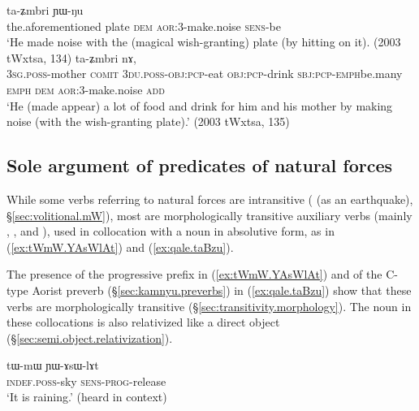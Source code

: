 \begin{exe}
\ex 
\begin{xlist}
\ex \label{ex:taZmbri}
  ta-ʑmbri ɲɯ-ŋu \\
 the.aforementioned plate \textsc{dem} \textsc{aor}:3\flobv{}-make.noise \textsc{sens}-be \\
\glt `He made noise with the (magical wish-granting) plate (by hitting on it). (2003 tWxtsa, 134)
\ex \label{ex:taZmbri2}
  ta-ʑmbri nɤ, \\
 \textsc{3sg}.\textsc{poss}-mother \textsc{comit} \textsc{3du}.\textsc{poss}-\textsc{obj}:\textsc{pcp}-eat \textsc{obj}:\textsc{pcp}-drink \textsc{sbj}:\textsc{pcp}-\textsc{emph}\redp{}be.many \textsc{emph} \textsc{dem} \textsc{aor}:3\flobv{}-make.noise \textsc{add} \\
\glt `He (made appear) a lot of food and drink for him and his mother by making noise (with the wish-granting plate).' (2003 tWxtsa, 135)
\end{xlist}
\end{exe}

\subsection{Sole argument of predicates of natural forces} \label{sec:absolutive.nature}
While some verbs referring to natural forces are intransitive ( (as an earthquake), §\ref{sec:volitional.mW}), most are morphologically transitive auxiliary verbs (mainly , ,  and ), used in collocation with a noun in absolutive form, as in (\ref{ex:tWmW.YAsWlAt}) and (\ref{ex:qale.taBzu}).

The presence of the progressive  prefix in (\ref{ex:tWmW.YAsWlAt}) and of the C-type Aorist  preverb (§\ref{sec:kamnyu.preverbs}) in (\ref{ex:qale.taBzu}) show that these verbs are morphologically transitive (§\ref{sec:transitivity.morphology}). The noun in these collocations is also relativized like a direct object (§\ref{sec:semi.object.relativization}).
 
\begin{exe}
\ex \label{ex:tWmW.YAsWlAt}
 \gll tɯ-mɯ ɲɯ-ɤsɯ-lɤt \\
 \textsc{indef}.\textsc{poss}-sky \textsc{sens}-\textsc{prog}-release \\
 \glt `It is raining.' (heard in context)
\end{exe}

